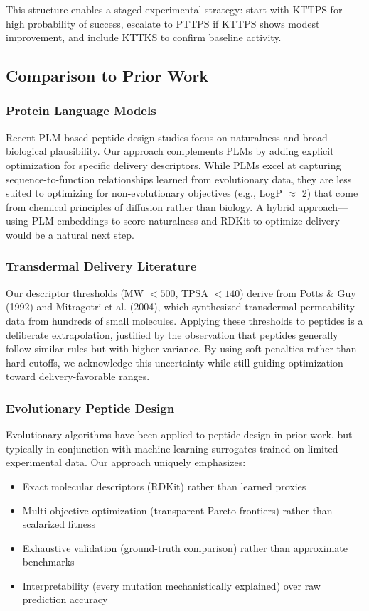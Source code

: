 \documentclass[11pt,a4paper]{article}
\begin{document}
This structure enables a staged experimental strategy: start with KTTPS for high probability of success, escalate to PTTPS if KTTPS shows modest improvement, and include KTTKS to confirm baseline activity.

\subsection{Comparison to Prior Work}

\subsubsection{Protein Language Models}

Recent PLM-based peptide design studies\cite{esm2023, peptide_plm2023} focus on naturalness and broad biological plausibility. Our approach complements PLMs by adding explicit optimization for specific delivery descriptors. While PLMs excel at capturing sequence-to-function relationships learned from evolutionary data, they are less suited to optimizing for non-evolutionary objectives (e.g., LogP $\approx$ 2) that come from chemical principles of diffusion rather than biology. A hybrid approach---using PLM embeddings to score naturalness and RDKit to optimize delivery---would be a natural next step.

\subsubsection{Transdermal Delivery Literature}

Our descriptor thresholds (MW $< 500$, TPSA $< 140$) derive from Potts \& Guy (1992) and Mitragotri et al. (2004), which synthesized transdermal permeability data from hundreds of small molecules. Applying these thresholds to peptides is a deliberate extrapolation, justified by the observation that peptides generally follow similar rules but with higher variance\cite{peptide_delivery2020}. By using soft penalties rather than hard cutoffs, we acknowledge this uncertainty while still guiding optimization toward delivery-favorable ranges.

\subsubsection{Evolutionary Peptide Design}

Evolutionary algorithms have been applied to peptide design in prior work\cite{protein_ga2023, peptide_ga2021}, but typically in conjunction with machine-learning surrogates trained on limited experimental data. Our approach uniquely emphasizes:
\begin{itemize}
  \item Exact molecular descriptors (RDKit) rather than learned proxies
  \item Multi-objective optimization (transparent Pareto frontiers) rather than scalarized fitness
  \item Exhaustive validation (ground-truth comparison) rather than approximate benchmarks
  \item Interpretability (every mutation mechanistically explained) over raw prediction accuracy
\end{itemize}
\end{document}

